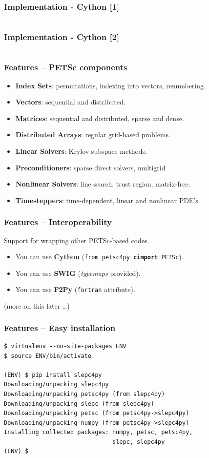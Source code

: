 \documentclass{beamer}
\begin{document}
\begin{frame}
  \frametitle{Implementation - Cython [1]}
  \small\inputminted[firstline=1]{cython}{cython.pxi}
\end{frame}
\begin{frame}
  \frametitle{Implementation - Cython [2]}
  \small\inputminted[firstline=3]{cython}{cython.pyx}
\end{frame}

\begin{frame}
  \frametitle{Features -- PETSc components}
  \begin{itemize}
  \item \textbf{Index Sets}: permutations, indexing into vectors, renumbering.
  \item \textbf{Vectors}: sequential and distributed.
  \item \textbf{Matrices}: sequential and distributed, sparse and dense.
  \item \textbf{Distributed Arrays}: regular grid-based problems.
  \item \textbf{Linear Solvers}: Krylov subspace methods.
  \item \textbf{Preconditioners}: sparse direct solvers, multigrid
  \item \textbf{Nonlinear Solvers}: line search, trust region, matrix-free.
  \item \textbf{Timesteppers}: time-dependent, linear and nonlinear PDE's.
  \end{itemize}
\end{frame}

\begin{frame}
  \frametitle{Features -- Interoperability}
  Support for wrapping other PETSc-based codes.
  \begin{itemize}
  \item You can use \textbf{Cython} 
    (\texttt{from petsc4py {\bf cimport} PETSc}).
  \item You can use \textbf{SWIG} (\textsl{typemaps} provided).
  \item You can use \textbf{F2Py} (\texttt{fortran} attribute).
  \end{itemize}
  \bigskip
  (more on this later \ldots)
\end{frame}

\begin{frame}[fragile]
  \frametitle{Features -- Easy installation}
\begin{verbatim}
$ virtualenv --no-site-packages ENV
$ source ENV/bin/activate

(ENV) $ pip install slepc4py
Downloading/unpacking slepc4py
Downloading/unpacking petsc4py (from slepc4py)
Downloading/unpacking slepc (from slepc4py)
Downloading/unpacking petsc (from petsc4py->slepc4py)
Downloading/unpacking numpy (from petsc4py->slepc4py)
Installing collected packages: numpy, petsc, petsc4py,
                               slepc, slepc4py
(ENV) $
\end{verbatim}
\end{frame}
\end{document}
